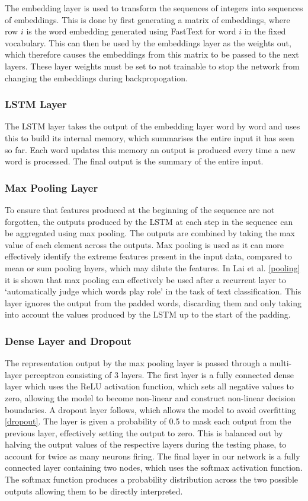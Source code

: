 \documentclass[12pt,a4paper,twoside,openright]{report}
\begin{document}
The embedding layer is used to transform the sequences of integers into sequences of embeddings. This is done by first generating a matrix of embeddings, where row $i$ is the word embedding generated using FastText for word $i$ in the fixed vocabulary. This can then be used by the embeddings layer as the weights out, which therefore causes the embeddings from this matrix to be passed to the next layers. These layer weights must be set to not trainable to stop the network from changing the embeddings during backpropogation. 
 
\subsubsection{LSTM Layer}
The LSTM layer takes the output of the embedding layer word by word and uses this to build its internal memory, which summarises the entire input it has seen so far. Each word updates this memory an output is produced every time a new word is processed. The final output is the summary of the entire input.

\subsubsection{Max Pooling Layer}
To ensure that features produced at the beginning of the sequence are not forgotten, the outputs produced by the LSTM at each step in the sequence can be aggregated using max pooling. The outputs are combined by taking the max value of each element across the outputs. Max pooling is used as it can more effectively identify the extreme features present in the input data, compared to mean or sum pooling layers, which may dilute the features. In Lai et al. \ref{pooling} it is shown that max pooling can effectively be used after a recurrent layer to `automatically judge which words play role' in the task of text classification. This layer ignores the output from the padded words, discarding them and only taking into account the values produced by the LSTM up to the start of the padding. 

\subsubsection{Dense Layer and Dropout}
The representation output by the max pooling layer is passed through a multi-layer perceptron consisting of 3 layers. The first layer is a fully connected dense layer which uses the ReLU activation function, which sets all negative values to zero, allowing the model to become non-linear and construct non-linear decision boundaries. A dropout layer follows, which allows the model to avoid overfitting \ref{dropout}. The layer is given a probability of 0.5 to mask each output from the previous layer, effectively setting the output to zero. This is balanced out by halving the output values of the respective layers during the testing phase, to account for twice as many neurons firing.  The final layer in our network is a fully connected layer containing two nodes, which uses the softmax activation function. The softmax function produces a probability distribution across the two possible outputs allowing them to be directly interpreted.
\end{document}
